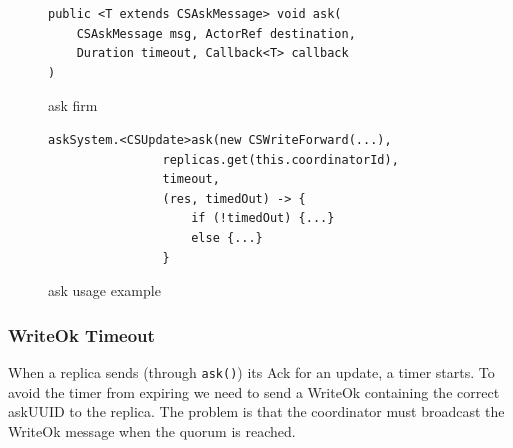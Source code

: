 \documentclass[a4paper]{article}
\begin{document}
            \begin{figure}[H]
            \begin{verbatim}
public <T extends CSAskMessage> void ask(
    CSAskMessage msg, ActorRef destination,
    Duration timeout, Callback<T> callback
)
                \end{verbatim}
                \caption{ask firm}
                \label{code:askfirm}
            \end{figure}

            \begin{figure}[H]
            \begin{verbatim}
askSystem.<CSUpdate>ask(new CSWriteForward(...),
                replicas.get(this.coordinatorId),
                timeout,
                (res, timedOut) -> {
                    if (!timedOut) {...}
                    else {...}
                }
                \end{verbatim}
            
                \caption{ask usage example}
                \label{code:askexample}
            \end{figure}
        \subsubsection{WriteOk Timeout}
            When a replica sends (through \texttt{ask()}) its Ack for an update, a timer starts. To avoid the timer from expiring we need to send a WriteOk containing the correct askUUID to the replica.
            The problem is that the coordinator must broadcast the WriteOk message when the quorum is reached.
\end{document}
